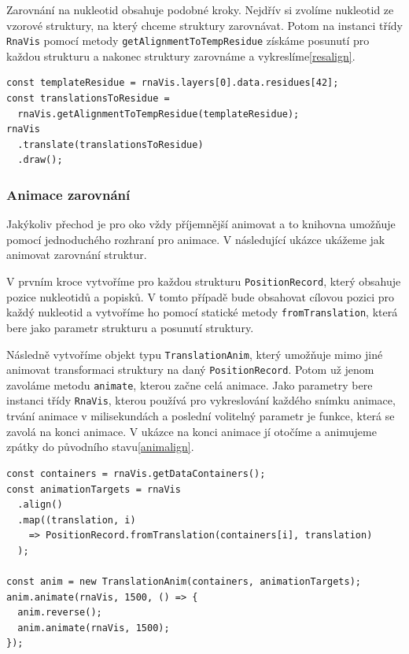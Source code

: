 Zarovnání na nukleotid obsahuje podobné kroky. Nejdřív si zvolíme nukleotid ze
vzorové struktury, na který chceme struktury zarovnávat. Potom na instanci
třídy \texttt{RnaVis} pomocí metody \texttt{getAlignmentToTempResidue} získáme
posunutí pro každou strukturu a nakonec struktury zarovnáme a vykreslíme\ref{resalign}.

\begin{lstlisting}[caption={Zarovnání struktur na nukleotid}, label=resalign]
const templateResidue = rnaVis.layers[0].data.residues[42];
const translationsToResidue = 
  rnaVis.getAlignmentToTempResidue(templateResidue);
rnaVis
  .translate(translationsToResidue)
  .draw();
\end{lstlisting}

\subsubsection{Animace zarovnání}

Jakýkoliv přechod je pro oko vždy příjemnější animovat a to knihovna umožňuje
pomocí jednoduchého rozhraní pro animace. V následující ukázce ukážeme jak
animovat zarovnání struktur.

V prvním kroce vytvoříme pro každou strukturu \texttt{PositionRecord}, který
obsahuje pozice nukleotidů a popisků. V tomto případě bude obsahovat cílovou
pozici pro každý nukleotid a vytvoříme ho pomocí statické metody
\texttt{fromTranslation}, která bere jako parametr strukturu a posunutí
struktury.

Následně vytvoříme objekt typu \texttt{TranslationAnim}, který umožňuje mimo
jiné animovat transformaci struktury na daný \texttt{PositionRecord}. Potom už
jenom zavoláme metodu \texttt{animate}, kterou začne celá animace. Jako
parametry bere instanci třídy \texttt{RnaVis}, kterou používá pro vykreslování
každého snímku animace, trvání animace v milisekundách a poslední volitelný
parametr je funkce, která se zavolá na konci animace. V ukázce na konci animace
jí otočíme a animujeme zpátky do původního stavu\ref{animalign}.

\begin{lstlisting}[caption={Animace zarovnání}, label=animalign]
const containers = rnaVis.getDataContainers();
const animationTargets = rnaVis
  .align()
  .map((translation, i) 
    => PositionRecord.fromTranslation(containers[i], translation)
  );

const anim = new TranslationAnim(containers, animationTargets);
anim.animate(rnaVis, 1500, () => {
  anim.reverse();
  anim.animate(rnaVis, 1500);
});
\end{lstlisting}

